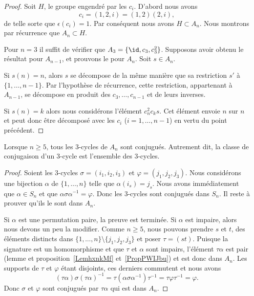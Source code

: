 \begin{proof}
	Soit \( H\), le groupe engendré par les \( c_i\). D'abord nous avons
	\begin{equation}
		c_i=(1,2,i)=(1,2)(2,i),
	\end{equation}
	de telle sorte que \( \epsilon(c_i)=1\). Par conséquent nous avons \( H\subset A_n\). Nous montrons par récurrence que \( A_n\subset H\).

	Pour \( n=3\) il suffit de vérifier que \( A_3=\{ \id,c_3,c_3^2 \}\). Supposons avoir obtenu le résultat pour \(A_{n-1}\), et prouvons le pour \( A_n\). Soit \( s\in A_n\).

	Si \( s(n)=n\), alors \( s\) se décompose de la même manière que sa restriction \( s'\) à \( \{ 1,\ldots, n-1 \}\). Par l'hypothèse de récurrence, cette restriction, appartenant à \( A_{n-1}\),  se décompose en produit des \( c_3,\ldots, c_{n-1}\) et de leurs inverses.

	Si \( s(n)=k\) alors nous considérons l'élément \( c^2_nc_ks\). Cet élément envoie \( n\) sur \( n\) et peut donc être décomposé avec les \( c_i\) (\( i=1,\ldots, n-1\)) en vertu du point précédent.
\end{proof}

\begin{proposition} \label{PropiodtBG}
	Lorsque \( n\geq 5\), tous les \( 3\)-cycles de \( A_n\) sont conjugués. Autrement dit, la classe de conjugaison d'un \( 3\)-cycle est l'ensemble des \( 3\)-cycles.
\end{proposition}

\begin{proof}
	Soient les \( 3\)-cycles \( \sigma=(i_1,i_2,i_3)\) et \( \varphi=(j_1,j_2,j_3)\). Nous considérons une bijection \( \alpha\) de \( \{ 1,\ldots, n \}\) telle que \( \alpha(i_s)=j_s\). Nous avons immédiatement que \( \alpha\in S_n\) et que \( \alpha\sigma\alpha^{-1}=\varphi\). Donc les \( 3\)-cycles sont conjugués dans \( S_n\). Il reste à prouver qu'ils le sont dans \( A_n\).

	Si \( \alpha\) est une permutation paire, la preuve est terminée. Si \( \alpha\) est impaire, alors nous devons un peu la modifier. Comme \( n\geq 5\), nous pouvons prendre \( s\) et \( t\), des éléments distincts dans \( \{ 1,\ldots, n \}\setminus\{ j_1,j_2,j_3 \}\) et poser \( \tau=(st)\). Puisque la signature est un homomorphisme et que \( \tau\) et \( \alpha\) sont impairs, l'élément \( \tau\alpha\) est pair (lemme et proposition~\ref{LemhxnkMf} et~\ref{PropPWIJbu}) et est donc dans \( A_n\). Les supports de \( \tau\) et \( \varphi\) étant disjoints, ces derniers commutent et nous avons
	\begin{equation}
		(\tau\alpha)\sigma(\tau\alpha)^{-1}=\tau(\alpha\sigma\alpha^{-1})\tau^{-1}=\tau\varphi\tau^{-1} = \varphi.
	\end{equation}
	Donc \( \sigma\) et \( \varphi\) sont conjugués par \( \tau\alpha\) qui est dans \( A_n\).
\end{proof}

